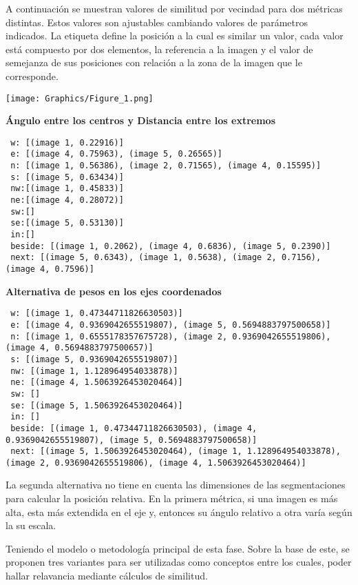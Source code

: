 A continuación se muestran valores de similitud por vecindad para dos métricas distintas. Estos valores son ajustables cambiando valores de parámetros indicados. La etiqueta define la posición a la cual es similar un valor, cada valor está compuesto por dos elementos, la referencia a la imagen y el valor de semejanza de sus posiciones con relación a la zona de la imagen que le corresponde.

\begin{adjustbox}{valign=c, center}
\texttt{[image: Graphics/Figure\_1.png]}
\end{adjustbox}

\noindent\textbf{\'Angulo entre los centros y Distancia entre los extremos}
\begin{lstlisting}
 w: [(image 1, 0.22916)]
 e: [(image 4, 0.75963), (image 5, 0.26565)]
 n: [(image 1, 0.56386), (image 2, 0.71565), (image 4, 0.15595)]
 s: [(image 5, 0.63434)]
 nw:[(image 1, 0.45833)]
 ne:[(image 4, 0.28072)]
 sw:[]
 se:[(image 5, 0.53130)]
 in:[]
 beside: [(image 1, 0.2062), (image 4, 0.6836), (image 5, 0.2390)]
 next: [(image 5, 0.6343), (image 1, 0.5638), (image 2, 0.7156), (image 4, 0.7596)]
\end{lstlisting}

\noindent\textbf{Alternativa de pesos en los ejes coordenados}
\begin{lstlisting}
 w: [(image 1, 0.47344711826630503)]
 e: [(image 4, 0.9369042655519807), (image 5, 0.5694883797500658)]
 n: [(image 1, 0.6555178357675728), (image 2, 0.9369042655519806), (image 4, 0.5694883797500657)]
 s: [(image 5, 0.9369042655519807)]
 nw: [(image 1, 1.128964954033878)]
 ne: [(image 4, 1.5063926453020464)]
 sw: []
 se: [(image 5, 1.5063926453020464)]
 in: []
 beside: [(image 1, 0.47344711826630503), (image 4, 0.9369042655519807), (image 5, 0.5694883797500658)]
 next: [(image 5, 1.5063926453020464), (image 1, 1.128964954033878), (image 2, 0.9369042655519806), (image 4, 1.5063926453020464)]

\end{lstlisting}
La segunda alternativa no tiene en cuenta las dimensiones de las segmentaciones para calcular la posición relativa. En la primera métrica, si una imagen es más alta, esta más extendida en el eje y, entonces su ángulo relativo a otra varía según la su escala.

Teniendo el modelo o metodolog\'ia principal de esta fase. Sobre la base de este, se proponen tres variantes para ser utilizadas como conceptos entre los cuales, poder hallar relavancia mediante cálculos de similitud.

